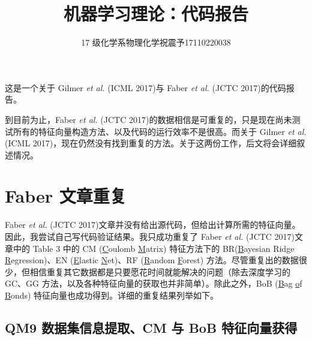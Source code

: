 \documentclass[10pt,a4paper,onecolumn]{article}
\providecommand*{\heiti}{\CJKfamily{zhhei}}
\providecommand*{\kaiti}{\CJKfamily{zhkai}}
\numberwithin{equation}{section}
\begin{document}


\title{%
  \heiti \huge \vspace{-25pt} 机器学习理论：代码报告}

\author{\kaiti \large 17 级化学系\hspace{\fntsize}物理化学\hspace{\fntsize}祝震予\hspace{\fntsize}17110220038}

  \maketitle
\vspace{-10pt}



这是一个关于 Gilmer \emph{et al.} (ICML 2017)\citep{Gilmer-Dahl.ICoML.2017.70}与 Faber \emph{et al.} (JCTC 2017)\citep{Faber-Lilienfeld.JCTC.2017.13}的代码报告。

到目前为止，Faber \emph{et al.} (JCTC 2017)\citep{Faber-Lilienfeld.JCTC.2017.13}的数据相信是可重复的，只是现在尚未测试所有的特征向量构造方法、以及代码的运行效率不是很高。而关于 Gilmer \emph{et al.} (ICML 2017)\citep{Gilmer-Dahl.ICoML.2017.70}，现在仍然没有找到重复的方法。关于这两份工作，后文将会详细叙述情况。

\section{Faber 文章重复}

Faber \emph{et al.} (JCTC 2017)\citep{Faber-Lilienfeld.JCTC.2017.13}文章并没有给出源代码，但给出计算所需的特征向量。因此，我尝试自己写代码验证结果。我只成功重复了 Faber \emph{et al.} (JCTC 2017)\citep{Faber-Lilienfeld.JCTC.2017.13}文章中的 Table 3 中的 CM (\underline Coulomb \underline Matrix) 特征方法下的 BR(\underline Bayesian Ridge \underline Regression)、EN (\underline Elastic \underline Net)、RF (\underline Random \underline Forest) 方法。尽管重复出的数据很少，但相信重复其它数据都是只要愿花时间就能解决的问题（除去深度学习的 GC、GG 方法，以及各种特征向量的获取也并非简单）。除此之外，BoB (\underline Bag \underline of \underline Bonds) 特征向量也成功得到。详细的重复结果列举如下。

\subsection{QM9 数据集信息提取、CM 与 BoB 特征向量获得}
\end{document}
